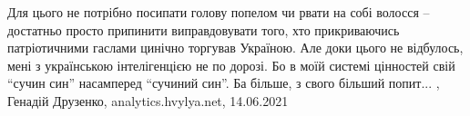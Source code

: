 Для цього не потрібно посипати голову попелом чи рвати на собі волосся –
достатньо просто припинити виправдовувати того, хто прикриваючись патріотичними
гаслами цинічно торгував Україною.  Але доки цього не відбулось, мені з
українською інтелігенцією не по дорозі. Бо в моїй системі цінностей свій \enquote{сучин
син} насамперед \enquote{сучиний син}. Ба більше, з свого більший попит...
, Генадій Друзенко, 
analytics.hvylya.net, 14.06.2021

